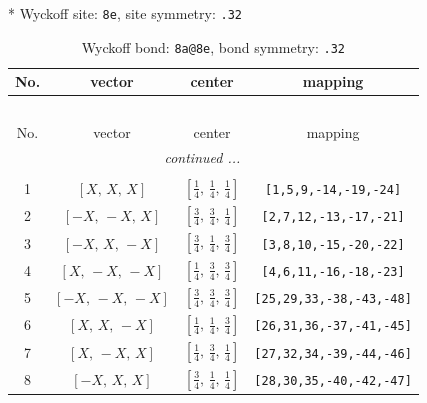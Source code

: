 \documentclass[fleqn,8pt]{jsarticle}
\begin{document}
* Wyckoff site: {\tt 8e}, site symmetry: {\tt .32}
\renewcommand{\arraystretch}{1.2}
\begin{longtable}{cccc}
\caption{Wyckoff bond: {\tt 8a@8e}, bond symmetry: {\tt .32}}
 \\
 \hline \hline
No. & vector & center & mapping \\ \hline \endfirsthead

\multicolumn{3}{l}{\tablename\ \thetable{}} \\
 \hline \hline
No. & vector & center & mapping \\ \hline \endhead

 \hline \hline
\multicolumn{3}{r}{\footnotesize\it continued ...} \\ \endfoot

 \hline \hline
\multicolumn{3}{r}{} \\ \endlastfoot

1 & $\left[ X,\, X,\, X \right]$ & $\left[ \frac{1}{4},\, \frac{1}{4},\, \frac{1}{4} \right]$ & {\tt [1,5,9,-14,-19,-24]} \\ \hline
2 & $\left[ - X,\, - X,\, X \right]$ & $\left[ \frac{3}{4},\, \frac{3}{4},\, \frac{1}{4} \right]$ & {\tt [2,7,12,-13,-17,-21]} \\ \hline
3 & $\left[ - X,\, X,\, - X \right]$ & $\left[ \frac{3}{4},\, \frac{1}{4},\, \frac{3}{4} \right]$ & {\tt [3,8,10,-15,-20,-22]} \\ \hline
4 & $\left[ X,\, - X,\, - X \right]$ & $\left[ \frac{1}{4},\, \frac{3}{4},\, \frac{3}{4} \right]$ & {\tt [4,6,11,-16,-18,-23]} \\ \hline
5 & $\left[ - X,\, - X,\, - X \right]$ & $\left[ \frac{3}{4},\, \frac{3}{4},\, \frac{3}{4} \right]$ & {\tt [25,29,33,-38,-43,-48]} \\ \hline
6 & $\left[ X,\, X,\, - X \right]$ & $\left[ \frac{1}{4},\, \frac{1}{4},\, \frac{3}{4} \right]$ & {\tt [26,31,36,-37,-41,-45]} \\ \hline
7 & $\left[ X,\, - X,\, X \right]$ & $\left[ \frac{1}{4},\, \frac{3}{4},\, \frac{1}{4} \right]$ & {\tt [27,32,34,-39,-44,-46]} \\ \hline
8 & $\left[ - X,\, X,\, X \right]$ & $\left[ \frac{3}{4},\, \frac{1}{4},\, \frac{1}{4} \right]$ & {\tt [28,30,35,-40,-42,-47]} \\
\end{longtable}
\renewcommand{\arraystretch}{1.2}
\end{document}

